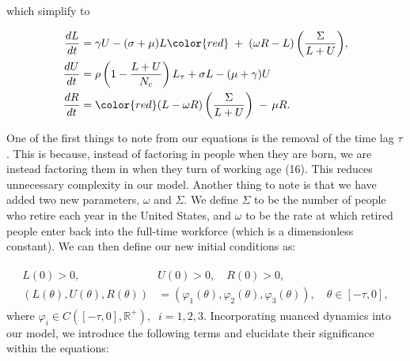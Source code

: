 \documentclass[11pt]{amsart}
\begin{document}
which simplify to 

\begin{align}
    \begin{split}
        \frac{dL}{dt} &= \gamma U - (\sigma + \mu)L {\color{red}\; + \;(\omega R - L)\left(\frac{\Sigma}{L + U}\right)},\\
        \frac{dU}{dt} &= \rho\left(1 - \frac{L + U}{N_c} \right)L_{\tau} + \sigma L -(\mu + \gamma)U  \\
        \frac{dR}{dt} &= {\color{red}(L - \omega R)\left(\frac{\Sigma}{L + U}\right) \; - \, \mu R}.
    \end{split}
\end{align}

One of the first things to note from our equations is the removal of the time lag $\tau$. 
This is because, instead of factoring in people when they are born, we are instead factoring them
in when they turn of working age (16). This reduces unnecessary complexity in our model. Another thing to note
is that we have added two new parameters, $\omega$ and $\Sigma$. We define $\Sigma$ to be the number of people who
retire each year in the United States, and $\omega$ to be the rate at which retired people enter back
into the full-time workforce (which is a dimensionless constant). We can then define our new initial conditions as:

\begin{align}
    \begin{split}
        L(0) > 0, \quad &U(0) > 0, \quad R(0) > 0, \\
        (L(\theta),U(\theta), R(\theta)) &= (\varphi_1(\theta), \varphi_2(\theta), \varphi_3(\theta)), \quad \theta \in [-\tau,0],
    \end{split}
\end{align}
where $\varphi_i\in C([-\tau, 0], \mathbb{R}^+),\;\; i=1,2,3$. Incorporating nuanced dynamics into our model, we introduce the following terms and elucidate their significance within the equations:
\end{document}
